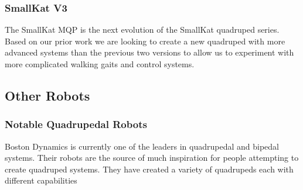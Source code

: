     \subsubsection{SmallKat V3}
    The SmallKat MQP is the next evolution of the SmallKat quadruped series. Based on our prior work we are looking to create a new quadruped with more advanced systems than the previous two versions to allow  us to experiment with more complicated walking gaits and control systems.

\subsection{Other Robots}
\subsubsection{Notable Quadrupedal Robots}
Boston Dynamics is currently one of the leaders in quadrupedal and bipedal systems. Their robots are the source of much inspiration for people attempting to create quadruped systems. They have created a variety of quadrupeds each with different capabilities
